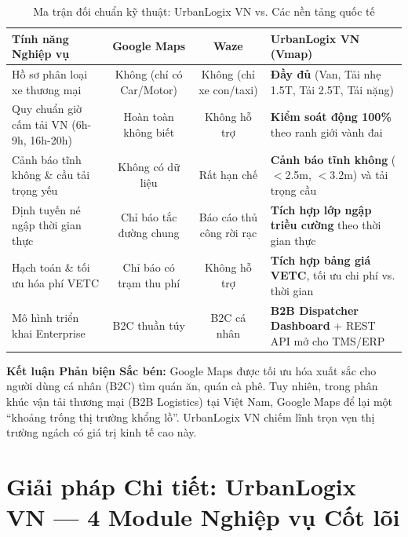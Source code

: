 \documentclass[11pt,a4paper]{article}
\begin{document}
\begin{table}[htbp]
  \centering
  \small
  \caption{Ma trận đối chuẩn kỹ thuật: UrbanLogix VN vs. Các nền tảng quốc tế}
  \label{tab:benchmark}
  \begin{tabularx}{\textwidth}{p{4.2cm} c c Y}
    \toprule
     \color{white}\textbf{Tính năng Nghiệp vụ} & \color{white}\textbf{Google Maps} & \color{white}\textbf{Waze} & \color{white}\textbf{UrbanLogix VN (Vmap)} \\
    \midrule
    Hồ sơ phân loại xe thương mại & Không (chỉ có Car/Motor) & Không (chỉ xe con/taxi) & \textbf{Đầy đủ} (Van, Tải nhẹ 1.5T, Tải 2.5T, Tải nặng) \\
    Quy chuẩn giờ cấm tải VN (6h-9h, 16h-20h) & Hoàn toàn không biết & Không hỗ trợ & \textbf{Kiểm soát động 100\%} theo ranh giới vành đai \\
    Cảnh báo tĩnh không \& cầu tải trọng yếu & Không có dữ liệu & Rất hạn chế & \textbf{Cảnh báo tĩnh không} ($<$2.5m, $<$3.2m) và tải trọng cầu \\
    Định tuyến né ngập thời gian thực & Chỉ báo tắc đường chung & Báo cáo thủ công rời rạc & \textbf{Tích hợp lớp ngập triều cường} theo thời gian thực \\
    Hạch toán \& tối ưu hóa phí VETC & Chỉ báo có trạm thu phí & Không hỗ trợ & \textbf{Tích hợp bảng giá VETC}, tối ưu chi phí vs. thời gian \\
    Mô hình triển khai Enterprise & B2C thuần túy & B2C cá nhân & \textbf{B2B Dispatcher Dashboard} + REST API mở cho TMS/ERP \\
    \bottomrule
  \end{tabularx}
\end{table}

\begin{insightbox}[accent]
\textbf{Kết luận Phản biện Sắc bén:} Google Maps được tối ưu hóa xuất sắc cho người dùng cá nhân (B2C) tìm quán ăn, quán cà phê. Tuy nhiên, trong phân khúc vận tải thương mại (B2B Logistics) tại Việt Nam, Google Maps để lại một ``khoảng trống thị trường khổng lồ''. UrbanLogix VN chiếm lĩnh trọn vẹn thị trường ngách có giá trị kinh tế cao này.
\end{insightbox}

\section{Giải pháp Chi tiết: UrbanLogix VN — 4 Module Nghiệp vụ Cốt lõi}
\end{document}
